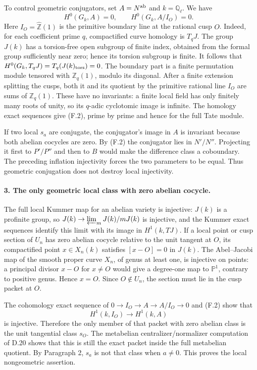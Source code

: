 To control geometric conjugators, set
$A=N^{\rm ab}$ and $k=\mathbb Q_\ell$.  We have
\[
 H^0(G_k,A)=0,\qquad H^0(G_k,A/I_O)=0.                 \tag{F.2}
\]
Here $I_O=\widehat{\mathbb Z}(1)$ is the primitive boundary
line at the rational cusp $O$.  Indeed, for each coefficient
prime $q$, compactified curve homology is $T_qJ$.
The group $J(k)$ has a torsion-free open subgroup of finite
index, obtained from the formal group sufficiently near zero;
hence its torsion subgroup is finite.  It follows that
$H^0(G_k,T_qJ)=T_q(J(k)_{\rm tors})=0$.  The boundary part
is a finite permutation module tensored with $\mathbb Z_q(1)$,
modulo its diagonal.  After a finite extension splitting the
cusps, both it and its quotient by the primitive rational line
$I_O$ are sums of $\mathbb Z_q(1)$.  These have no invariants:
a finite local field has only finitely many roots of unity,
so its $q$-adic cyclotomic image is infinite.  The homology
exact sequences give (F.2), prime by prime and hence for the
full Tate module.

If two local $s_a$ are conjugate, the conjugator's image in
$A$ is invariant because both abelian cocycles are zero.
By (F.2) the conjugator lies in $N'/N''$.  Projecting it first
to $P'/P''$ and then to $B$ would make the difference class a
coboundary.  The preceding inflation injectivity forces the
two parameters to be equal.  Thus geometric conjugation does
not destroy local injectivity.

\paragraph{3. The only geometric local class with zero abelian cocycle.}

The full local Kummer map for an abelian variety is injective:
$J(k)$ is a profinite group, so
$J(k)\to\varprojlim_m J(k)/mJ(k)$ is injective, and the Kummer
exact sequences identify this limit with its image in
$H^1(k,TJ)$.  If a local point or cusp section of $U_n$ has
zero abelian cocycle relative to the unit tangent at $O$, its
compactified point $x\in X_n(k)$ satisfies
$[x-O]=0$ in $J(k)$.  The Abel--Jacobi map of the smooth proper
curve $X_n$, of genus at least one, is injective on points:
a principal divisor $x-O$ for $x\ne O$ would give a degree-one
map to $\mathbb P^1$, contrary to positive genus.  Hence
$x=O$.  Since $O\notin U_n$, the section must lie in the cusp
packet at $O$.

The cohomology exact sequence of
$0\to I_O\to A\to A/I_O\to0$ and (F.2) show that
\[
                H^1(k,I_O)\longrightarrow H^1(k,A)
\]
is injective.  Therefore the only member of that packet with
zero abelian class is the unit tangential class $s_O$.
The metabelian centralizer/normalizer computation of D.20
shows that this is still the exact packet inside the full
metabelian quotient.  By Paragraph 2, $s_a$ is not that class
when $a\ne0$.  This proves the local nongeometric assertion.

